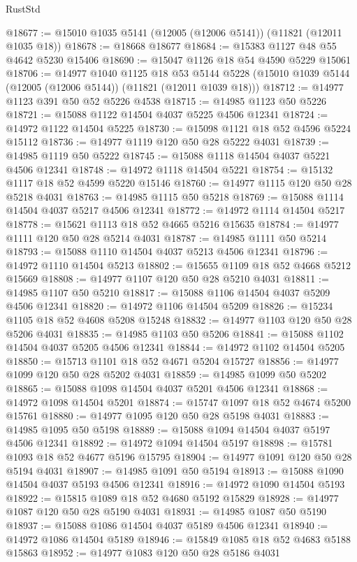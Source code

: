 \begin{lexlean}{RustStd}
\begin{coremodule}
@18677 := @15010 @1035 @5141 (@12005 (@12006 @5141)) (@11821 (@12011 @1035 @18))
@18678 := @18668 @18677
@18684 := @15383 @1127 @48 @55 @4642 @5230 @15406
@18690 := @15047 @1126 @18 @54 @4590 @5229 @15061
@18706 := @14977
    @1040
    @1125
    @18
    @53
    @5144
    @5228
    (@15010 @1039 @5144 (@12005 (@12006 @5144)) (@11821 (@12011 @1039 @18)))
@18712 := @14977 @1123 @391 @50 @52 @5226 @4538
@18715 := @14985 @1123 @50 @5226
@18721 := @15088 @1122 @14504 @4037 @5225 @4506 @12341
@18724 := @14972 @1122 @14504 @5225
@18730 := @15098 @1121 @18 @52 @4596 @5224 @15112
@18736 := @14977 @1119 @120 @50 @28 @5222 @4031
@18739 := @14985 @1119 @50 @5222
@18745 := @15088 @1118 @14504 @4037 @5221 @4506 @12341
@18748 := @14972 @1118 @14504 @5221
@18754 := @15132 @1117 @18 @52 @4599 @5220 @15146
@18760 := @14977 @1115 @120 @50 @28 @5218 @4031
@18763 := @14985 @1115 @50 @5218
@18769 := @15088 @1114 @14504 @4037 @5217 @4506 @12341
@18772 := @14972 @1114 @14504 @5217
@18778 := @15621 @1113 @18 @52 @4665 @5216 @15635
@18784 := @14977 @1111 @120 @50 @28 @5214 @4031
@18787 := @14985 @1111 @50 @5214
@18793 := @15088 @1110 @14504 @4037 @5213 @4506 @12341
@18796 := @14972 @1110 @14504 @5213
@18802 := @15655 @1109 @18 @52 @4668 @5212 @15669
@18808 := @14977 @1107 @120 @50 @28 @5210 @4031
@18811 := @14985 @1107 @50 @5210
@18817 := @15088 @1106 @14504 @4037 @5209 @4506 @12341
@18820 := @14972 @1106 @14504 @5209
@18826 := @15234 @1105 @18 @52 @4608 @5208 @15248
@18832 := @14977 @1103 @120 @50 @28 @5206 @4031
@18835 := @14985 @1103 @50 @5206
@18841 := @15088 @1102 @14504 @4037 @5205 @4506 @12341
@18844 := @14972 @1102 @14504 @5205
@18850 := @15713 @1101 @18 @52 @4671 @5204 @15727
@18856 := @14977 @1099 @120 @50 @28 @5202 @4031
@18859 := @14985 @1099 @50 @5202
@18865 := @15088 @1098 @14504 @4037 @5201 @4506 @12341
@18868 := @14972 @1098 @14504 @5201
@18874 := @15747 @1097 @18 @52 @4674 @5200 @15761
@18880 := @14977 @1095 @120 @50 @28 @5198 @4031
@18883 := @14985 @1095 @50 @5198
@18889 := @15088 @1094 @14504 @4037 @5197 @4506 @12341
@18892 := @14972 @1094 @14504 @5197
@18898 := @15781 @1093 @18 @52 @4677 @5196 @15795
@18904 := @14977 @1091 @120 @50 @28 @5194 @4031
@18907 := @14985 @1091 @50 @5194
@18913 := @15088 @1090 @14504 @4037 @5193 @4506 @12341
@18916 := @14972 @1090 @14504 @5193
@18922 := @15815 @1089 @18 @52 @4680 @5192 @15829
@18928 := @14977 @1087 @120 @50 @28 @5190 @4031
@18931 := @14985 @1087 @50 @5190
@18937 := @15088 @1086 @14504 @4037 @5189 @4506 @12341
@18940 := @14972 @1086 @14504 @5189
@18946 := @15849 @1085 @18 @52 @4683 @5188 @15863
@18952 := @14977 @1083 @120 @50 @28 @5186 @4031

\end{coremodule}
\end{lexlean}
